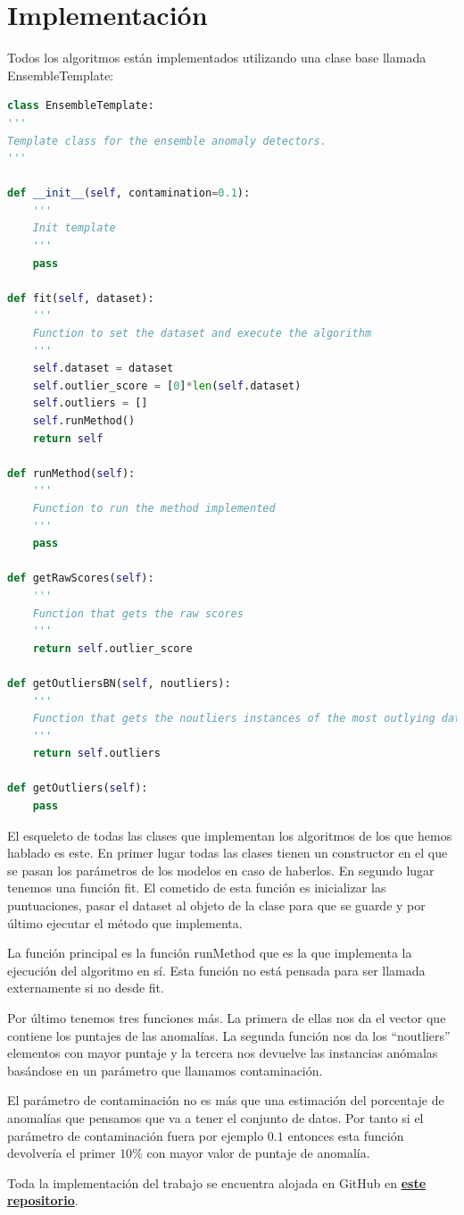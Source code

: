 \section{Implementación}

Todos los algoritmos están implementados utilizando una clase base llamada EnsembleTemplate:

\begin{lstlisting}[language=Python]
class EnsembleTemplate:
'''
Template class for the ensemble anomaly detectors.
'''

def __init__(self, contamination=0.1):
	'''
	Init template
	'''
	pass

def fit(self, dataset):
	'''
	Function to set the dataset and execute the algorithm
	'''
	self.dataset = dataset
	self.outlier_score = [0]*len(self.dataset)
	self.outliers = []
	self.runMethod()
	return self

def runMethod(self):
	'''
	Function to run the method implemented
	'''
	pass

def getRawScores(self):
	'''
	Function that gets the raw scores
	'''
	return self.outlier_score

def getOutliersBN(self, noutliers):
	'''
	Function that gets the noutliers instances of the most outlying data
	'''
	return self.outliers

def getOutliers(self):
	pass
\end{lstlisting}

El esqueleto de todas las clases que implementan los algoritmos de los que hemos hablado es este. En primer lugar todas las clases tienen un constructor en el que se pasan los parámetros de los modelos en caso de haberlos. En segundo lugar tenemos una función fit. El cometido de esta función es inicializar las puntuaciones, pasar el dataset al objeto de la clase para que se guarde y por último ejecutar el método que implementa.

La función principal es la función runMethod que es la que implementa la ejecución del algoritmo en sí. Esta función no está pensada para ser llamada externamente si no desde fit. 

Por último tenemos tres funciones más. La primera de ellas nos da el vector que contiene los puntajes de las anomalías. La segunda función nos da los ``noutliers'' elementos con mayor puntaje y la tercera nos devuelve las instancias anómalas basándose en un parámetro que llamamos contaminación. 

El parámetro de contaminación no es más que una estimación del porcentaje de anomalías que pensamos que va a tener el conjunto de datos. Por tanto si el parámetro de contaminación fuera por ejemplo $0.1$ entonces esta función devolvería el primer $10\%$ con mayor valor de puntaje de anomalía.

Toda la implementación del trabajo se encuentra alojada en GitHub en \href{https://github.com/nacheteam/Ensemble-Outlier-Analysis}{\textbf{\underline{este repositorio}}}.